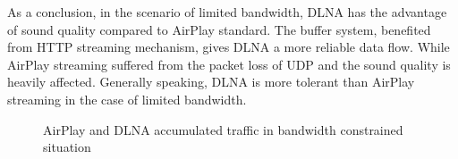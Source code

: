 As a conclusion, in the scenario of limited bandwidth, DLNA has the advantage
of sound quality compared to AirPlay standard. The buffer system, benefited
from HTTP streaming mechanism, gives DLNA a more reliable data flow. While
AirPlay streaming suffered from the packet loss of UDP and the sound quality is
heavily affected. Generally speaking, DLNA is more tolerant than AirPlay
streaming in the case of limited bandwidth. 
\begin{figure}[hb]%
\caption{AirPlay and DLNA accumulated traffic in
bandwidth constrained situation\label{all_traffic_bw}}
\end{figure}
